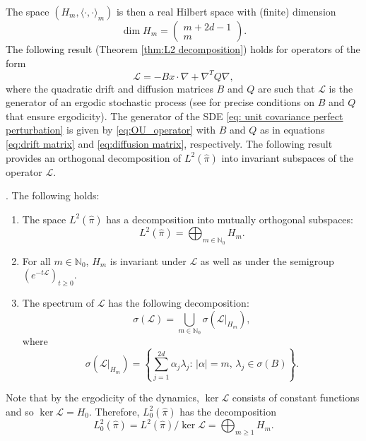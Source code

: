 The space $(H_{m},\langle\cdot,\cdot\rangle_{m})$ is then a real Hilbert
space with (finite) dimension
\[
\dim H_{m}=\left(\begin{array}{c}
m+2d-1\\
m
\end{array}\right).
\]
The following result (Theorem \ref{thm:L2 decomposition}) holds for operators of the form
\begin{equation}
\label{eq:OU_operator}
\mathcal{L}=-Bx\cdot\nabla+\nabla^{T}Q\nabla,
\end{equation}
where the quadratic drift and diffusion matrices $B$ and $Q$ are such that $\mathcal{L}$ is the generator of an ergodic stochastic process (see \cite[Definition 2.1]{Arnold2014} for precise conditions on $B$ and $Q$ that ensure ergodicity). The generator of the SDE \eqref{eq: unit covariance perfect perturbation} is given by \eqref{eq:OU_operator} with $B$ and $Q$  as in equations \eqref{eq:drift matrix}
and \eqref{eq:diffusion matrix}, respectively.  The following result provides an orthogonal decomposition of $L^{2}(\widehat{\pi})$ into invariant subspaces of the operator $\mathcal{L}$.
\begin{theorem}{\cite[Section 5]{Arnold2014}.}
	\label{thm:L2 decomposition}The following holds:
	\begin{enumerate}[label=(\alph*)]
		\item The space $L^{2}(\widehat{\pi})$ has a decomposition into mutually orthogonal
		subspaces:
		\[
		L^{2}(\widehat{\pi})=\bigoplus_{m\in\mathbb{N}_{0}}H_{m}.
		\]
		
		\item For all $m\in\mathbb{N}_{0}$, $H_{m}$ is invariant under $\mathcal{L}$
		as well as under the semigroup $(e^{-t\mathcal{L}})_{t\ge0}$. 
		\item The spectrum of $\mathcal{L}$ has the following decomposition:
		\[
		\sigma(\mathcal{L})=\bigcup_{m\in\mathbb{N}_{0}}\sigma(\mathcal{L}\vert_{H_{m}}),
		\]
		where 
		\begin{equation}
		\sigma(\mathcal{L}\vert_{H_{m}})=\left\lbrace\sum_{j=1}^{2d}\alpha_{j}\lambda_{j}:\,\vert\alpha\vert=m,\,\lambda_{j}\in\sigma(B)\right\rbrace.\label{eq:spectrum on subspaces}
		\end{equation}
		
	\end{enumerate}
\end{theorem}
\begin{remark}
	Note that by the ergodicity of the dynamics, $\ker\mathcal{L}$ consists of constant functions and so $\ker\mathcal{L}=H_{0}$. Therefore, $L^2_0(\widehat{\pi})$ has the decomposition
	\[
	L_{0}^{2}(\widehat{\pi})=L^{2}(\widehat{\pi})/\ker\mathcal{L}=\bigoplus_{m\ge1}H_{m}.
	\]
	\end{remark}
